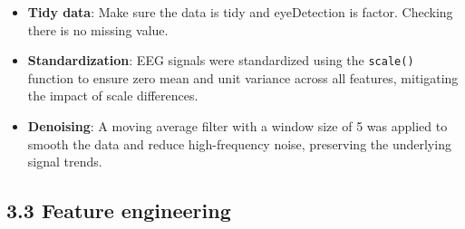 \documentclass[
  doc]{apa6}
\providecommand{\tightlist}{%
  \setlength{\itemsep}{0pt}\setlength{\parskip}{0pt}}
\begin{document}
\begin{itemize}
\tightlist
\item
  \textbf{Tidy data}: Make sure the data is tidy and eyeDetection is factor. Checking there is no missing value.
\item
  \textbf{Standardization}: EEG signals were standardized using the \texttt{scale()} function to ensure zero mean and unit variance across all features, mitigating the impact of scale differences.
\item
  \textbf{Denoising}: A moving average filter with a window size of 5 was applied to smooth the data and reduce high-frequency noise, preserving the underlying signal trends.
\end{itemize}

\subsection{3.3 Feature engineering}\label{feature-engineering}
\end{document}
